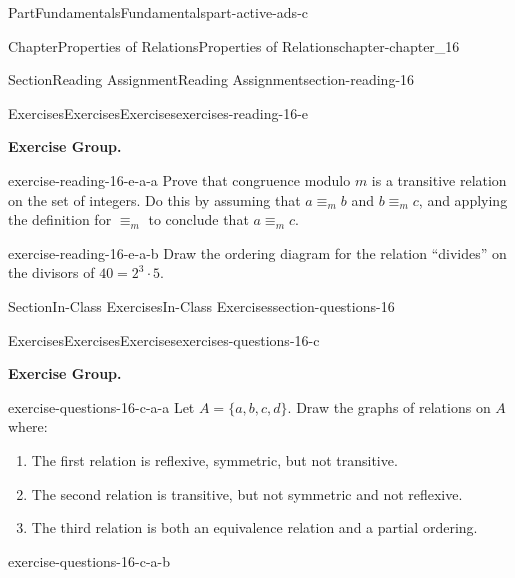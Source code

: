\documentclass[oneside,10pt,]{book}
\numberwithin{equation}{section}
\begin{document}
\begin{partptx}{Part}{Fundamentals}{}{Fundamentals}{}{}{part-active-ads-c}
\begin{chapterptx}{Chapter}{Properties of Relations}{}{Properties of Relations}{}{}{chapter-chapter_16}
\begin{sectionptx}{Section}{Reading Assignment}{}{Reading Assignment}{}{}{section-reading-16}
\begin{exercises-subsection-numberless}{Exercises}{Exercises}{}{Exercises}{}{}{exercises-reading-16-e}
\par\medskip\noindent%
\textbf{Exercise Group.}\space\space%
\begin{exercisegroup}
\begin{divisionexerciseeg}{1}{}{}{exercise-reading-16-e-a-a}%
Prove that congruence modulo \(m\) is a transitive relation on the set of integers. Do this by assuming that \(a \equiv_m b \) and \(b\equiv_m c\), and applying the definition for \(\equiv_m\) to conclude that \(a \equiv_m c\).%
\end{divisionexerciseeg}%
\begin{divisionexerciseeg}{2}{}{}{exercise-reading-16-e-a-b}%
Draw the ordering diagram for the relation ``divides'' on the divisors of \(40=2^3 \cdot 5\).%
\end{divisionexerciseeg}%
\end{exercisegroup}
\par\medskip\noindent
\end{exercises-subsection-numberless}
\end{sectionptx}
%
%
\typeout{************************************************}
\typeout{************************************************}
%
\begin{sectionptx}{Section}{In-Class Exercises}{}{In-Class Exercises}{}{}{section-questions-16}
%
%
%
\typeout{************************************************}
\typeout{************************************************}
%
\begin{exercises-subsection-numberless}{Exercises}{Exercises}{}{Exercises}{}{}{exercises-questions-16-c}
\par\medskip\noindent%
\textbf{Exercise Group.}\space\space%
\begin{exercisegroup}
\begin{divisionexerciseeg}{1}{}{}{exercise-questions-16-c-a-a}%
Let \(A = \{a, b, c, d\}\). Draw the graphs of relations on \(A\) where:%
\begin{enumerate}[label=(\alph*)]
\item{}The first relation is  reflexive, symmetric, but not transitive.%
\item{}The second relation is transitive, but not symmetric and not reflexive.%
\item{}The third relation is both an equivalence relation and a partial ordering.%
\end{enumerate}
%
\end{divisionexerciseeg}%
\begin{divisionexerciseeg}{2}{}{}{exercise-questions-16-c-a-b}%

\end{divisionexerciseeg}
\end{exercisegroup}
\end{exercises-subsection-numberless}
\end{sectionptx}
\end{chapterptx}
\end{partptx}
\end{document}
